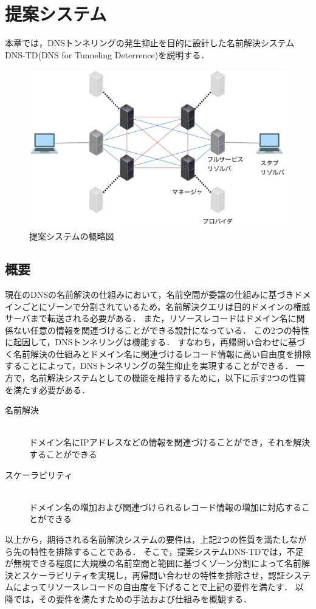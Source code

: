 \section{提案システム}
本章では，DNSトンネリングの発生抑止を目的に設計した名前解決システムDNS-TD(DNS for Tunneling Deterrence)を説明する．
\begin{figure}[h]
 \centering
 \label{fig:abstruct-DNS-TD-architecture}
 \includegraphics[scale=0.6]{figure/new-architecture-DNS-TD.png}
 \caption{提案システムの概略図}
\end{figure}
\subsection{概要}
\label{sec:DNS-TD}
現在のDNSの名前解決の仕組みにおいて，名前空間が委譲の仕組みに基づきドメインごとにゾーンで分割されているため，名前解決クエリは目的ドメインの権威サーバまで転送される必要がある．
また，リソースレコードはドメイン名に関係ない任意の情報を関連づけることができる設計になっている．
この2つの特性に起因して，DNSトンネリングは機能する．
すなわち，再帰問い合わせに基づく名前解決の仕組みとドメイン名に関連づけるレコード情報に高い自由度を排除することによって，DNSトンネリングの発生抑止を実現することができる．
一方で，名前解決システムとしての機能を維持するために，以下に示す2つの性質を満たす必要がある．
\begin{description}
 \item[名前解決]\mbox{}\\ ドメイン名にIPアドレスなどの情報を関連づけることができ，それを解決することができる
 \item[スケーラビリティ]\mbox{}\\ ドメイン名の増加および関連づけられるレコード情報の増加に対応することができる
\end{description}
以上から，期待される名前解決システムの要件は，上記2つの性質を満たしながら先の特性を排除することである．
そこで，提案システムDNS-TDでは，不足が無視できる程度に大規模の名前空間と範囲に基づくゾーン分割によって名前解決とスケーラビリティを実現し，再帰問い合わせの特性を排除させ，認証システムによってリソースレコードの自由度を下げることで上記の要件を満たす．
以降では，その要件を満たすための手法および仕組みを概観する．\newline

